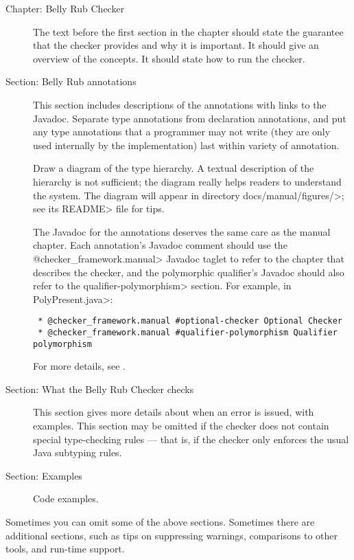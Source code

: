 \begin{description}

\item[Chapter: Belly Rub Checker]
  The text before the first section in the chapter should state the
  guarantee that the checker provides and why it is important.  It should
  give an overview of the concepts.  It should state how to run the checker.

\item[Section: Belly Rub annotations]
  This section includes descriptions of the annotations with links to the
  Javadoc.  Separate type annotations from declaration annotations, and put
  any type annotations that a programmer may not write (they are only used
  internally by the implementation) last within variety of annotation.

  Draw a diagram of the type hierarchy.  A textual description of
  the hierarchy is not sufficient; the diagram really helps readers to
  understand the system.
  The diagram will appear in directory \<docs/manual/figures/>;
  see its \<README> file for tips.

  The Javadoc for the annotations deserves the same care as the manual
  chapter.  Each annotation's Javadoc comment should use the
  \<@checker\_framework.manual> Javadoc taglet to refer to the chapter that
  describes the checker, and the polymorphic qualifier's Javadoc should
  also refer to the \<qualifier-polymorphism> section.  For example, in
  \<PolyPresent.java>:

  \begin{Verbatim}
 * @checker_framework.manual #optional-checker Optional Checker
 * @checker_framework.manual #qualifier-polymorphism Qualifier polymorphism
  \end{Verbatim}

  \noindent
  For more details, see .

\item[Section: What the Belly Rub Checker checks]
  This section gives more details about when an error is issued, with examples.
  This section may be omitted if the checker does not contain special
  type-checking rules --- that is, if the checker only enforces the usual
  Java subtyping rules.

\item[Section: Examples]
  Code examples.
\end{description}

Sometimes you can omit some of the above sections.  Sometimes there are
additional sections, such as tips on suppressing warnings, comparisons to
other tools, and run-time support.

